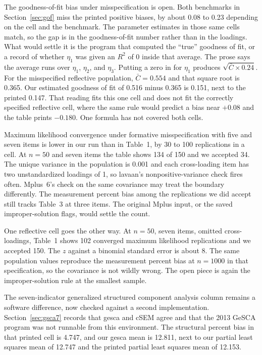 \documentclass[11pt]{article}
\begin{document}
The goodness-of-fit bias under misspecification is open. Both benchmarks in
Section~\ref{sec:gof} miss the printed positive biases, by about 0.08 to
0.23 depending on the cell and the benchmark. The parameter estimates in
those same cells match, so the gap is in the goodness-of-fit number rather
than in the loadings. What would settle it is the program that computed the
``true'' goodness of fit, or a record of whether $\eta_1$ was given an
$R^2$ of 0 inside that average. The prose says the average runs over
$\eta_1$, $\eta_2$, and $\eta_3$. Putting a zero in for $\eta_1$ produces
$\sqrt{\bar C \times 0.24}$. For the misspecified reflective population,
$\bar C = 0.554$ and that square root is 0.365. Our estimated goodness of
fit of 0.516 minus 0.365 is 0.151, next to the printed 0.147. That reading
fits this one cell and does not fit the correctly specified reflective
cell, where the same rule would predict a bias near $+0.08$ and the table
prints $-0.180$. One formula has not covered both cells.

Maximum likelihood convergence under formative misspecification with five
and seven items is lower in our run than in Table~1, by 30 to 100
replications in a cell. At $n=50$ and seven items the table shows 134 of
150 and we accepted 34. The unique variance in the population is 0.001 and
each cross-loading item has two unstandardized loadings of 1, so lavaan's
nonpositive-variance check fires often. Mplus~6's check on the same
covariance may treat the boundary differently. The measurement percent bias
among the replications we did accept still tracks Table~3 at three items.
The original Mplus input, or the saved improper-solution flags, would
settle the count.

One reflective cell goes the other way. At $n=50$, seven items, omitted
cross-loadings, Table~1 shows 102 converged maximum likelihood replications
and we accepted 150. The $z$ against a binomial standard error is about 8.
The same population values reproduce the measurement percent bias at
$n=1000$ in that specification, so the covariance is not wildly wrong. The
open piece is again the improper-solution rule at the smallest sample.

The seven-indicator generalized structured component analysis column remains
a software difference, now checked against a second implementation.
Section~\ref{sec:gsca7} records that gesca and cSEM agree and that the
2013 GeSCA program was not runnable from this environment. The structural
percent bias in that printed cell is 4.747, and our gesca mean is 12.811,
next to our partial least squares mean of 12.747 and the printed partial
least squares mean of 12.153.
\end{document}
